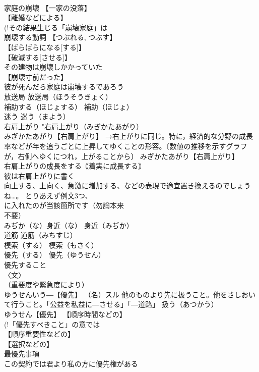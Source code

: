 \documentclass[8pt]{extreport}
\begin{document}
\begin{CJK}{UTF8}{min}
\\	家庭の崩壊 【一家の没落】
\\	【離婚などによる】
\\	(!その結果生じる「崩壊家庭」は 
\\	崩壊する動詞 【つぶれる, つぶす】
\\	【ばらばらになる[する]】
\\	【破滅する[させる]】
\\	その建物は崩壊しかかっていた 
\\	【崩壊寸前だった】
\\	彼が死んだら家庭は崩壊するであろう 
\\	放送局		放送局（ほうそうきょく） 
\\	補助する（ほじょする）		補助（ほじょ） 
\\	迷う		迷う（まよう） 
\\	右肩上がり		"右肩上がり（みぎかたあがり） 
\\	みぎかたあがり【右肩上がり】 →右上がりに同じ。特に，経済的な分野の成長率などが年を追うごとに上昇してゆくことの形容。〔数値の推移を示すグラフが，右側へゆくにつれ，上がることから〕 みぎかたあがり【右肩上がり】 
\\	右肩上がりの成長をする｟着実に成長する｠ 
\\	彼は右肩上がりに書く 
\\	向上する、上向く、急激に増加する、などの表現で適宜置き換えるのでしょうね…。 とりあえず例文3つ、
\\	に入れたのが当該箇所です（勿論本来 
\\	不要） 
\\	みぢか（な）身近（な）		身近（みぢか） 
\\	道筋		道筋（みちすじ） 
\\	模索（する）		模索（もさく） 
\\	優先（する）		優先（ゆうせん） 
\\	優先すること 
\\	〈文〉 
\\	（重要度や緊急度により） 
\\	ゆうせんいう―【優先】 （名）スル 他のものより先に扱うこと。他をさしおいて行うこと。「公益を私益に―させる」「―道路」 扱う（あつかう）
\\	ゆうせん【優先】 【順序時間などの】
\\	(!「優先すべきこと」の意では 
\\	【順序重要性などの】
\\	【選択などの】
\\	最優先事項 
\\	この契約では君より私の方に優先権がある 

\end{CJK}
\end{document}
